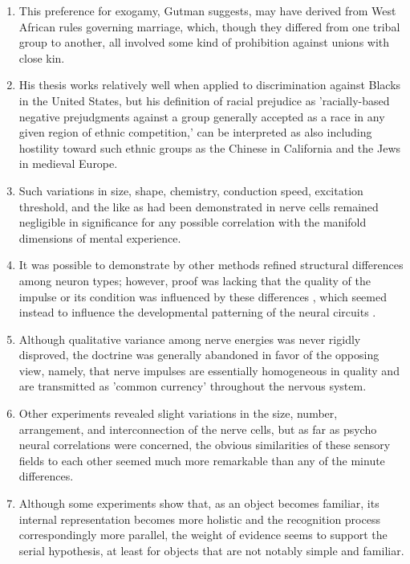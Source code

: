 \begin{enumerate}
\item This preference for exogamy, Gutman suggests, may have derived from  West African rules governing marriage, which, though they differed from one tribal group to another, all involved some kind of prohibition against unions with close kin. 

\item His thesis works relatively well when applied to discrimination against Blacks in the United States, but his definition of racial prejudice as 'racially-based negative prejudgments against a group generally accepted as a race in any given region of ethnic competition,' can be interpreted as also including hostility toward such ethnic groups as the Chinese in California and the Jews in medieval Europe. 

\item Such variations in size,  shape, chemistry,  conduction speed,  excitation threshold, and the like as had been demonstrated in nerve cells remained negligible in significance for any  possible correlation with the manifold dimensions of mental experience.

\item It was possible to demonstrate by other methods refined structural differences among neuron types; however, proof was lacking that the quality of the impulse or its condition was influenced by these differences , which seemed instead to influence the developmental patterning of the neural circuits .

\item Although qualitative variance among nerve energies was never rigidly disproved, the doctrine was generally abandoned in favor of the opposing view, namely, that nerve impulses are essentially homogeneous in quality and are transmitted as 'common currency' throughout the nervous system.

\item Other experiments revealed slight variations in the size, number,   arrangement, and interconnection of the nerve cells, but as far as psycho neural correlations were concerned, the obvious similarities of these sensory fields to each other seemed much more remarkable than any of the minute differences.

\item Although some experiments show that, as an object becomes familiar,  its internal representation becomes more holistic and the recognition process correspondingly more parallel, the weight of evidence seems to support the serial hypothesis,   at least for objects that are not notably simple and familiar. 


\end{enumerate}
